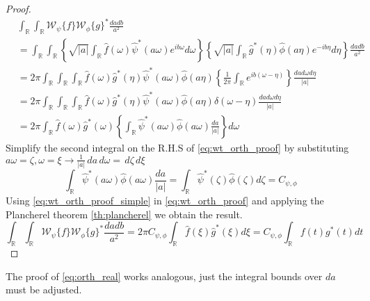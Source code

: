 \begin{proof}
    \begin{align}
        & \int_{\mathbb{R}} \int_{\mathbb{R}} \mathscr{W}_{\psi}\{f\} \mathscr{W}_{\phi}\{g\}^{\ast} \frac{da db }{a^2} \\
        &= \int_{\mathbb{R}} \int_{\mathbb{R}} \left\{ \sqrt{|a|} \int_{\mathbb{R}} \hat{f}(\omega) \hat{\psi}^{\ast}(a \omega) e^{ib \omega} d\omega \right\} \left\{ \sqrt{|a|} \int_{\mathbb{R}} \hat{g}^{\ast}(\eta) \hat{\phi}(a \eta) e^{-ib \eta} d\eta \right\} \frac{da db }{a^2} \\
        &= 2\pi \int_{\mathbb{R}} \int_{\mathbb{R}} \int_{\mathbb{R}} \hat{f}(\omega) \hat{g}^{\ast}(\eta) \hat{\psi}^{\ast}(a \omega) \hat{\phi}(a \eta) \left\{ \frac{1}{2 \pi} \int_{\mathbb{R}} e^{ib(\omega - \eta)}\right\} \frac{da d\omega d\eta}{|a|} \\
        &= 2\pi \int_{\mathbb{R}} \int_{\mathbb{R}} \int_{\mathbb{R}} \hat{f}(\omega) \hat{g}^{\ast}(\eta) \hat{\psi}^{\ast}(a \omega) \hat{\phi}(a \eta) \delta(\omega - \eta) \frac{da d\omega d\eta}{|a|} \\
        &= 2\pi \int_{\mathbb{R}} \hat{f}(\omega) \hat{g}^{\ast}(\omega) \left\{ \int_{\mathbb{R}} \hat{\psi}^{\ast} (a \omega) \hat{\phi} (a \omega) \frac{da}{|a|} \right\} d \omega \label{eq:wt_orth_proof}
    \end{align}
    Simplify the second integral on the R.H.S of \ref{eq:wt_orth_proof} by substituting $a \omega = \zeta, \omega=\xi \rightarrow \frac{1}{|a|}\,da \,d\omega =  \,d\zeta \,d\xi$ 
    \begin{equation}
        \int_{\mathbb{R}} \hat{\psi}^{\ast} (a \omega) \hat{\phi} (a \omega) \frac{da}{|a|} = \int_{\mathbb{R}} \hat{\psi}^{\ast} (\zeta) \hat{\phi} (\zeta) d\zeta = C_{\psi, \phi}
        \label{eq:wt_orth_proof_simple}
    \end{equation}
    Using \ref{eq:wt_orth_proof_simple} in \ref{eq:wt_orth_proof} and applying the Plancherel theorem \ref{th:plancherel} we obtain the result.
    \begin{equation}
        \int_{\mathbb{R}} \int_{\mathbb{R}} \mathscr{W}_{\psi}\{f\} \mathscr{W}_{\phi}\{g\}^{\ast} \frac{da db }{a^2} = 2\pi C_{\psi, \phi} \int_{\mathbb{R}} \hat{f}(\xi) \hat{g}^{\ast}(\xi) d\xi = C_{\psi, \phi} \int_{\mathbb{R}} f(t) g^{\ast}(t) dt
    \end{equation}
\end{proof}

The proof of \ref{eq:orth_real} works analogous, just the integral bounds over $da$ must be adjusted.

